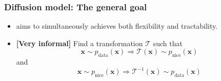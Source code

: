 \documentclass[10pt,xcolor={usenames,dvipsnames,table}]{beamer}
\begin{document}
\begin{frame}
\begin{itemize}
    \end{itemize}
\end{frame}

\begin{frame}
    \frametitle{Diffusion model: The general goal}
    \begin{itemize}
    \item {} aims to {\blue simultaneously achieves both flexibility and tractability}.
    \item 
        \textbf{[Very informal]}
        Find a transformation $\mathcal{T}$ such that
        \[
        \bm{x} \sim p_{\text{data}}(\bm{x}) \Rightarrow \mathcal{T}(\bm{x}) \sim p_{\text{nice}}(\bm{x})
        \] 
        and
        \[
        \bm{x} \sim p_{\text{nice}}(\bm{x}) \Rightarrow \mathcal{T}^{-1}(\bm{x}) \sim p_{\text{data}}(\bm{x})
        \] 
    \end{itemize}

\end{frame}
\end{document}
